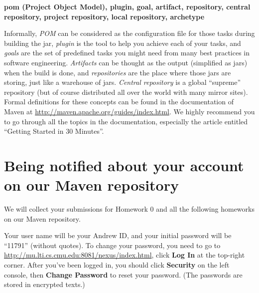 \begin{center}
\textbf{pom (Project Object Model), plugin, goal, artifact, repository, central repository, project repository, local repository, archetype}
\end{center}

Informally, \emph{POM} can be considered as the configuration file for those tasks during building the jar, \emph{plugin} is the tool to help you achieve each of your tasks, and \emph{goals} are the set of predefined tasks you might need from many best practices in software engineering. \emph{Artifacts} can be thought as the output (simplified as jars) when the build is done, and \emph{repositories} are the place where those jars are storing, just like a warehouse of jars. \emph{Central repository} is a global ``supreme'' repository (but of course distributed all over the world with many mirror sites). Formal definitions for these concepts can be found in the documentation of Maven at \url{http://maven.apache.org/guides/index.html}. We highly recommend you to go through all the topics in the documentation, especially the article entitled ``Getting Started in 30 Minutes''.

\section{Being notified about your account on our Maven repository}

We will collect your submissions for Homework 0 and all the following homeworks on our Maven repository.

Your user name will be your Andrew ID, and your initial password will be ``11791'' (without quotes). To change your password, you need to go to \url{http://mu.lti.cs.cmu.edu:8081/nexus/index.html}, click \textbf{Log In} at the top-right corner. After you've been logged in, you should click \textbf{Security} on the left console, then \textbf{Change Password} to reset your password. (The passwords are stored in encrypted texts.)
